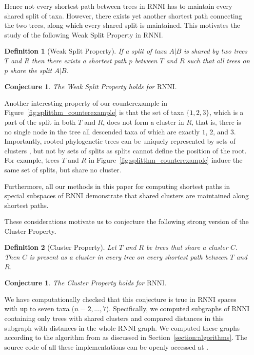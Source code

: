 \documentclass{amsart}
\newcommand{\rnni}{\mathrm{RNNI}}
\newtheorem*{definition}{Definition}
\newtheorem{conjecture}[theorem]{Conjecture}
\begin{document}
Hence not every shortest path between trees in $\rnni$ has to maintain every shared split of taxa.
However, there exists yet another shortest path connecting the two trees, along which every shared split is maintained.
This motivates the study of the following Weak Split Property in $\rnni$.

\begin{definition}[Weak Split Property]
If a split of taxa $A | B$ is shared by two trees $T$ and $R$ then there exists a shortest path $p$ between $T$ and $R$ such that all trees on $p$ share the split $A | B$.
\end{definition}

\begin{conjecture}
\label{conjecture:weak_split_theorem}
The Weak Split Property holds for $\rnni$.
\end{conjecture}

Another interesting property of our counterexample in Figure~\ref{fig:splitthm_counterexample} is that the set of taxa $\{1, 2, 3\}$, which is a part of the split in both $T$ and $R$, does not form a cluster in $R$, that is, there is no single node in the tree all descended taxa of which are exactly $1$, $2$, and $3$.
Importantly, rooted phylogenetic trees can be uniquely represented by sets of clusters \autocite{Steel2016-ye}, but not by sets of splits as splits cannot define the position of the root.
For example, trees $T$ and $R$ in Figure~\ref{fig:splitthm_counterexample} induce the same set of splits, but share no cluster.

Furthermore, all our methods in this paper for computing shortest paths in special subspaces of $\rnni$ demonstrate that shared clusters are maintained along shortest paths.

These considerations motivate us to conjecture the following strong version of the Cluster Property.

\begin{definition}[Cluster Property]
Let $T$ and $R$ be trees that share a cluster $C$.
Then $C$ is present as a cluster in every tree on every shortest path between $T$ and $R$.
\end{definition}

\begin{conjecture}
\label{conjecture:cluster_theorem}
The Cluster Property holds for $\rnni$.
\end{conjecture}

We have computationally checked that this conjecture is true in $\rnni$ spaces with up to seven taxa ($n = 2, \ldots, 7$).
Specifically, we computed subgraphs of $\rnni$ containing only trees with shared clusters and compared distances in this subgraph with distances in the whole $\rnni$ graph.
We computed these graphs according to the algorithm from \autocite{Gavryushkin2018-ol} as discussed in Section~\ref{section:algorithms}.
The source code of all these implementations can be openly accessed at \autocite{Collienne2019}.
\end{document}

